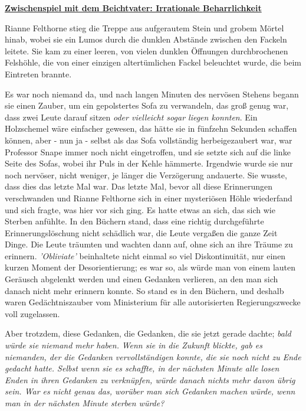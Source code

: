 

\hypertarget{zwischenspiel-mit-dem-beichtvater-irrationale-beharrlichkeit}{%

\textbf{\uline{Zwischenspiel mit dem Beichtvater: Irrationale Beharrlichkeit}}

Rianne Felthorne stieg die Treppe aus aufgerautem Stein und grobem Mörtel hinab, wobei sie ein Lumos durch die dunklen Abstände zwischen den Fackeln leitete. Sie kam zu einer leeren, von vielen dunklen Öffnungen durchbrochenen Felshöhle, die von einer einzigen altertümlichen Fackel beleuchtet wurde, die beim Eintreten brannte.

Es war noch niemand da, und nach langen Minuten des nervösen Stehens begann sie einen Zauber, um ein gepolstertes Sofa zu verwandeln, das groß genug war, dass zwei Leute darauf sitzen \emph{oder vielleicht sogar liegen konnten}. Ein Holzschemel wäre einfacher gewesen, das hätte sie in fünfzehn Sekunden schaffen können, aber - nun ja - selbst als das Sofa vollständig herbeigezaubert war, war Professor Snape immer noch nicht eingetroffen, und sie setzte sich auf die linke Seite des Sofas, wobei ihr Puls in der Kehle hämmerte. Irgendwie wurde sie nur noch nervöser, nicht weniger, je länger die Verzögerung andauerte. Sie wusste, dass dies das letzte Mal war. Das letzte Mal, bevor all diese Erinnerungen verschwanden und Rianne Felthorne sich in einer mysteriösen Höhle wiederfand und sich fragte, was hier vor sich ging. Es hatte etwas an sich, das sich wie Sterben anfühlte. In den Büchern stand, dass eine richtig durchgeführte Erinnerungslöschung nicht schädlich war, die Leute vergaßen die ganze Zeit Dinge. Die Leute träumten und wachten dann auf, ohne sich an ihre Träume zu erinnern. \emph{'Obliviate'} beinhaltete nicht einmal so viel Diskontinuität, nur einen kurzen Moment der Desorientierung; es war so, als würde man von einem lauten Geräusch abgelenkt werden und einen Gedanken verlieren, an den man sich danach nicht mehr erinnern konnte. So stand es in den Büchern, und deshalb waren Gedächtniszauber vom Ministerium für alle autorisierten Regierungszwecke voll zugelassen.

Aber trotzdem, diese Gedanken, die Gedanken, die sie jetzt gerade dachte; \emph{bald würde sie niemand mehr haben.} \emph{Wenn sie in die Zukunft blickte, gab es niemanden, der die Gedanken vervollständigen konnte, die sie noch nicht zu Ende gedacht hatte. Selbst wenn sie es schaffte, in der nächsten Minute alle losen Enden in ihren Gedanken zu verknüpfen, würde danach nichts mehr davon übrig sein. War es nicht genau das, worüber man sich Gedanken machen würde, wenn man in der nächsten Minute sterben würde?}

}
